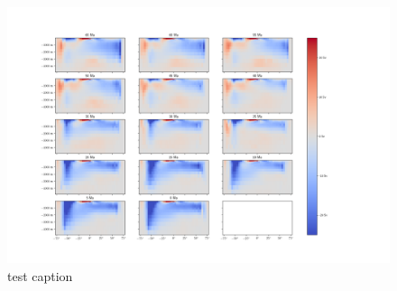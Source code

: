 \documentclass[a4paper]{article}
\begin{document}
\begin{figure}[H]
	\includegraphics[width=\linewidth]{overturning_overview.png}
	\caption{test caption}
	\label{fig:example1}
\end{figure}

\begin{multicols}{2}

\printbibliography

\end{multicols}
\end{document}
